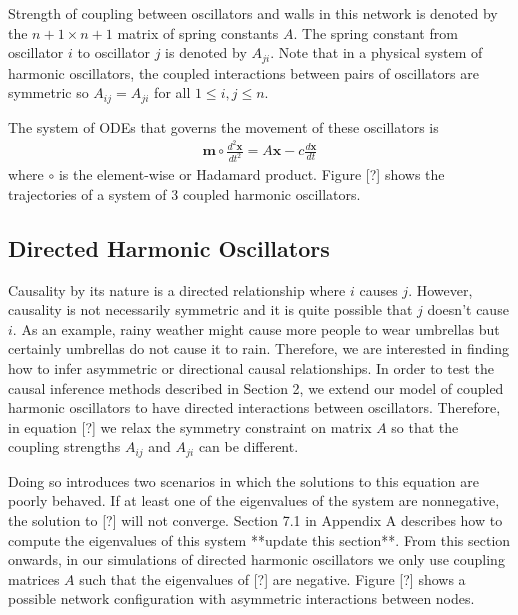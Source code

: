 \documentclass[]{article}
\begin{document}
Strength of coupling between oscillators and walls in this network is denoted by the $n + 1 \times n + 1$ matrix of spring constants $A$. The spring constant from oscillator $i$ to oscillator $j$ is denoted by $A_{ji}$. Note that in a physical system of harmonic oscillators, the coupled interactions between pairs of oscillators are symmetric so $A_{ij} = A_{ji}$ for all $1 \leq i, j \leq n$.

The system of ODEs that governs the movement of these oscillators is
\begin{align*}
\mathbf{m} \circ \frac{d^2\mathbf{x}}{dt^2} = A\mathbf{x} - c\frac{d\mathbf{x}}{dt}
\end{align*}
where $\circ$ is the element-wise or Hadamard product. Figure [?] shows the trajectories of a system of 3 coupled harmonic oscillators.

\subsection{Directed Harmonic Oscillators}
Causality by its nature is a directed relationship where $i$ causes $j$. However, causality is not necessarily symmetric and it is quite possible that $j$ doesn't cause $i$. As an example, rainy weather might cause more people to wear umbrellas but certainly umbrellas do not cause it to rain. Therefore, we are interested in finding how to infer asymmetric or directional causal relationships. In order to test the causal inference methods described in Section 2, we extend our model of coupled harmonic oscillators to have directed interactions between oscillators. Therefore, in equation [?] we relax the symmetry constraint on matrix $A$ so that the coupling strengths $A_{ij}$ and $A_{ji}$ can be different.

Doing so introduces two scenarios in which the solutions to this equation are poorly behaved. If at least one of the eigenvalues of the system are nonnegative, the solution to [?] will not converge. Section 7.1 in Appendix A describes how to compute the eigenvalues of this system **update this section**. From this section onwards, in our simulations of directed harmonic oscillators we only use coupling matrices $A$ such that the eigenvalues of [?] are negative.  Figure [?] shows a possible network configuration with asymmetric interactions between nodes.
\end{document}
